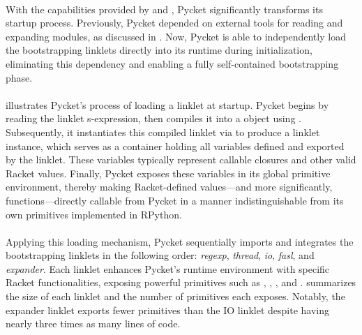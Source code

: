 		\paragraph{}%
			With the capabilities provided by  and , Pycket significantly transforms its startup process. Previously, Pycket depended on external tools for reading and expanding modules, as discussed in . Now, Pycket is able to independently load the bootstrapping linklets directly into its runtime during initialization, eliminating this dependency and enabling a fully self-contained bootstrapping phase.


		\paragraph{}%
			 illustrates Pycket's process of loading a linklet at startup. Pycket begins by reading the linklet s-expression, then compiles it into a  object using . Subsequently, it instantiates this compiled linklet via  to produce a linklet instance, which serves as a container holding all variables defined and exported by the linklet. These variables typically represent callable closures and other valid Racket values. Finally, Pycket exposes these variables in its global primitive environment, thereby making Racket-defined values—and more significantly, functions—directly callable from Pycket in a manner indistinguishable from its own primitives implemented in RPython.

		\paragraph{}%
			Applying this loading mechanism, Pycket sequentially imports and integrates the bootstrapping linklets in the following order: \emph{regexp}, \emph{thread}, \emph{io}, \emph{fasl}, and \emph{expander}. Each linklet enhances Pycket's runtime environment with specific Racket functionalities, exposing powerful primitives such as , , , and .  summarizes the size of each linklet and the number of primitives each exposes. Notably, the expander linklet exports fewer primitives than the IO linklet despite having nearly three times as many lines of code.


